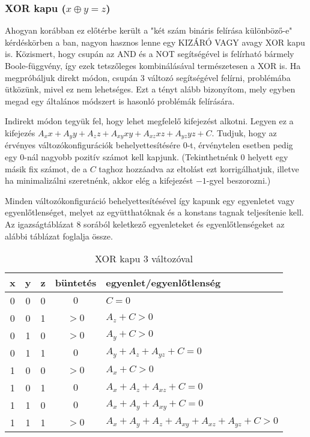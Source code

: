 \subsubsection{XOR kapu ($x \oplus y = z$)} \label{sec:XORgate}

Ahogyan korábban ez előtérbe került a "két szám bináris felírása különböző-e" kérdéskörben a ban, nagyon hasznos lenne egy KIZÁRÓ VAGY avagy XOR kapu is. Közismert, hogy csupán az AND és a NOT segítségével is felírható bármely Boole-függvény, így ezek tetszőleges kombinálásával természetesen a XOR is.
Ha megpróbáljuk direkt módon, csupán 3 változó segítségével felírni, problémába ütközünk, mivel ez nem lehetséges. Ezt a tényt alább bizonyítom, mely egyben megad egy általános módszert is hasonló problémák felírására.

Indirekt módon tegyük fel, hogy lehet megfelelő kifejezést alkotni. Legyen ez a kifejezés $A_xx+A_yy+A_zz+A_{xy}xy+A_{xz}xz+A_{yz}yz+C$. Tudjuk, hogy az érvényes változókonfigurációk behelyettesítésére $0$-t, érvénytelen esetben pedig egy $0$-nál nagyobb pozitív számot kell kapjunk. 
(Tekinthetnénk $0$ helyett egy másik fix számot, de a $C$ taghoz hozzáadva az eltolást ezt korrigálhatjuk, illetve ha minimalizálni szeretnénk, akkor elég a kifejezést $-1$-gyel beszorozni.)

Minden változókonfiguráció behelyettesítésével így kapunk egy egyenletet vagy egyenlőtlenséget, melyet az együtthatóknak és a konstans tagnak teljesítenie kell. Az igazságtáblázat 8 sorából keletkező egyenleteket és egyenlőtlenségeket az alábbi táblázat foglalja össze.

\begin{table}[ht]
	\footnotesize
	\centering
	\begin{tabular}{ c c c c l }
		\toprule
		x & y & z & büntetés & egyenlet/egyenlőtlenség \\
		\midrule
		0 & 0 & 0 & $0 $ & $C=0$   \\
		0 & 0 & 1 & $>0$ & $A_{z}+C>0$ \\
		0 & 1 & 0 & $>0$ & $A_{y}+C>0$ \\
		0 & 1 & 1 & $0 $ & $A_{y}+A_{z}+A_{yz}+C=0$   \\
		1 & 0 & 0 & $>0$ & $A_{x}+C>0$ \\
		1 & 0 & 1 & $0 $ & $A_{x}+A_{z}+A_{xz}+C=0$   \\
		1 & 1 & 0 & $0 $ & $A_{x}+A_{y}+A_{xy}+C=0$   \\
		1 & 1 & 1 & $>0$ & $A_{x}+A_{y}+A_{z}+A_{xy}+A_{xz}+A_{yz}+C>0$ \\				
		\bottomrule
	\end{tabular}
	\caption{XOR kapu 3 változóval}
	\label{tab:XORgate3var}
\end{table}

